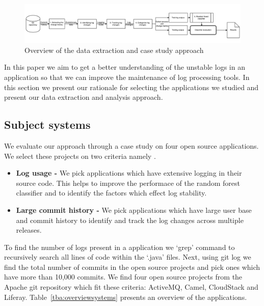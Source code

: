 \begin{figure}
	\centering
	\includegraphics[width=1\textwidth,
	height=.20\textwidth]{LogGenalogyMethdology}
	\caption{Overview of the data extraction and case study approach}
	\label{fig:LGmethod}
\end{figure}

In this paper we aim to get a better understanding of the unstable logs in an application so that we can improve the maintenance of log processing tools. In this section we present our rationale for selecting the applications we studied and present our data extraction and analysis approach.

\subsection{Subject systems}
We evaluate our approach through a case study on four open source applications. We select these projects on two criteria namely .
\begin{itemize}
	\item \textbf{Log usage -} We pick applications which have extensive logging in their source code. This helps to improve the performace of the random forest classifier and to identify the factors which effect log stability.
	\item \textbf{Large commit history -} We pick applications which have large user base and commit history to identify and track the log changes across multiple releases. 
\end{itemize}

To find the number of logs present in a application we `grep' command to recursively search all lines of code within the `.java' files. Next, using git log we find the total number of commits in the open source projects and pick ones which have more than 10,000 commits. We find four open source projects from the Apache git repository which fit these criteria: ActiveMQ, Camel, CloudStack  and Liferay. Table~\ref{tba:overviewsystems} presents an overview of the applications.



